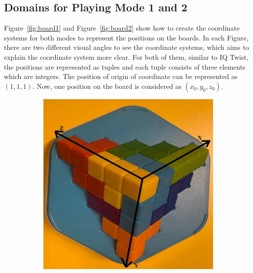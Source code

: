 \subsection{Domains for Playing Mode 1 and 2}
\label{sec:3Ddomains}
Figure~\ref{fig:board1} and Figure~\ref{fig:board2} show how to create the coordinate systems for both modes to represent the positions on the boards. In each Figure, there are two different visual angles to see the coordinate systems, which aims to explain the coordinate system more clear. For both of them, similar to IQ Twist, the positions are represented as tuples and each tuple consists of three elements which are integers. The position of origin of coordinate can be represented as $(1,1,1)$. Now, one position on the board is considered as $(x_{0},y_{0},z_{0})$.
\begin{figure}[htbp]
\centering
\begin{subfigure}[b]{.45\textwidth}
\centering
\includegraphics[width=\textwidth]{figs/ZIGZAGmodel1board.jpg}
\caption{}
\label{figure:mode1A}
\end{subfigure}
\begin{subfigure}[b]{.45\textwidth}
\centering

\end{subfigure}
\end{figure}
